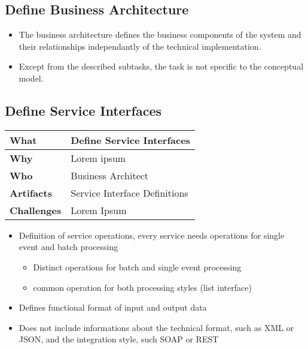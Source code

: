 \subsection{Define Business Architecture}

\begin{itemize}
	\item The business architecture defines the business components of the system and their relationships independantly of the technical implementation.
	\item Except from the described subtasks, the task is not specific to the conceptual model.
\end{itemize}

\subsection{Define Service Interfaces}
\begin{minipage}{\textwidth}
 \label{table:ch6_Task_Define_Service_Interfaces}
\begin{tabular}
	{|m{3cm}|m{10cm}|} \hline \bfseries What & Define Service Interfaces\\
	\hline \bfseries Why & Lorem ipsum\\
	\hline \bfseries Who & Business Architect\\
	\hline \bfseries Artifacts & Service Interface Definitions\\
	\hline \bfseries Challenges & Lorem Ipsum\\
	\hline 
\end{tabular}
\end{minipage}

\begin{itemize}
	\item Definition of service operations, every service needs operations for single event and batch processing
	\begin{itemize}
		\item Distinct operations for batch and single event processing
		\item common operation for both processing styles (list interface)
	\end{itemize}
	\item Defines functional format of input and output data
	\item Does not include informations about the technical format, such as \ac{XML} or \ac{JSON}, and the integration style, such SOAP or \ac{REST}
\end{itemize}

